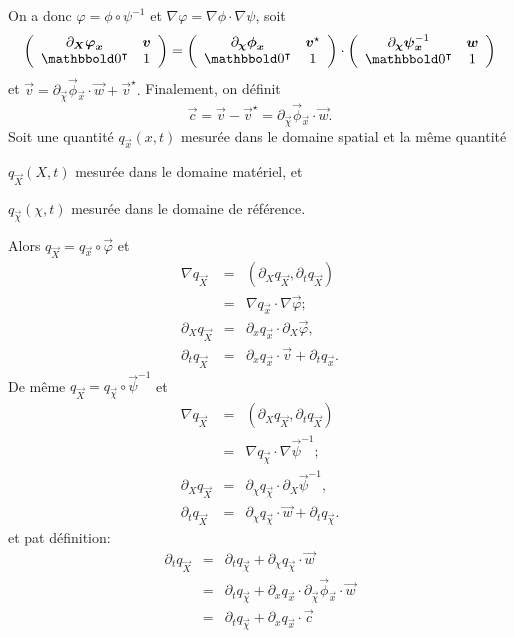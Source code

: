 \documentclass[11pt,a4paper]{article}
\begin{document}
On a donc $ \varphi  = \phi \circ \psi^{-1}$ et $\nabla \varphi = \nabla\phi \cdot \nabla \psi $, soit
$$ 
\left(
\begin{array}{cc}
\partial_{\vec X} \vec{\varphi}_{\vec x} & \vec{v}\\
\zeros^\T & 1
\end{array}
\right)
 = 
 \left(
\begin{array}{cc}
\partial_{\vec \chi} \vec{\phi}_{\vec x} & \vec{v}^\star\\
\zeros^\T & 1
\end{array}
\right)
\cdot 
\left(
\begin{array}{cc}
\partial_{\vec \chi} \vec{\psi}^{-1}_{\vec x} & \vec{w}\\
\zeros^\T & 1
\end{array}
\right)$$
%
et $\vec{v} = \partial_{\vec \chi} \vec{\phi}_{\vec x} \cdot  \vec{w} + \vec{v}^\star.$
%
Finalement, on définit 
$$ 
\vec c = \vec v - \vec v ^\star = \partial_{\vec \chi} \vec{\phi}_{\vec x} \cdot  \vec{w} .
$$
%
Soit une quantité $q_{\vec x}(x, t)$ mesurée dans le domaine spatial et la même quantité
\begin{description}
\item $q_{\vec X}(X, t)$ mesurée dans le domaine matériel, et
\item  $q_{\vec \chi}(\chi, t)$ mesurée dans le domaine de référence.
\end{description}
%
Alors $q_{\vec X} = q_{\vec x}\circ \vec{\varphi}$ et 
$$ 
\begin{array}{rcl}
\nabla q_{\vec X} &=& \left( \partial _{X}q_{\vec X}, \partial_t q_{\vec X}\right) \\
&=&\nabla q_{\vec x}\cdot \nabla \vec{\varphi}; \\
 \partial _{X}q_{\vec X} &=&  \partial _{x}q_{\vec x}\cdot\partial _{X}\vec \varphi, \\
 \partial _{t}q_{\vec X} &=&  \partial _{x}q_{\vec x}\cdot\vec{v}+\partial_t q_{\vec x}.
\end{array}
$$
%
De même $q_{\vec X} = q_{\vec \chi}\circ \vec{\psi}^{-1}$ et 
$$ 
\begin{array}{rcl}
\nabla q_{\vec X} &=& \left( \partial _{X}q_{\vec X}, \partial_t q_{\vec X}\right) \\
&=&\nabla q_{\vec \chi}\cdot \nabla \vec{\psi}^{-1}; \\
 \partial _{X}q_{\vec X} &=&  \partial _{\chi}q_{\vec \chi}\cdot\partial _{X}  \vec{\psi}^{-1}, \\
 \partial _{t}q_{\vec X} &=&  \partial _{\chi}q_{\vec \chi}\cdot\vec{w}+\partial_t q_{\vec \chi}.
\end{array}
$$
%
et pat définition:
%
$$
\begin{array}{rcl}
\partial _{t}q_{\vec X} &=& \partial_t q_{\vec \chi} +  \partial _{\chi}q_{\vec \chi}\cdot\vec{w} \\
&=&\partial_t q_{\vec \chi} +  \partial _{x}q_{\vec x}\cdot\partial_{\vec \chi}\vec \phi_{\vec x}\cdot\vec{w} \\
&=&\partial_t q_{\vec \chi} +  \partial _{x}q_{\vec x}\cdot\vec{c}
\end{array}
$$
%
\end{document}
